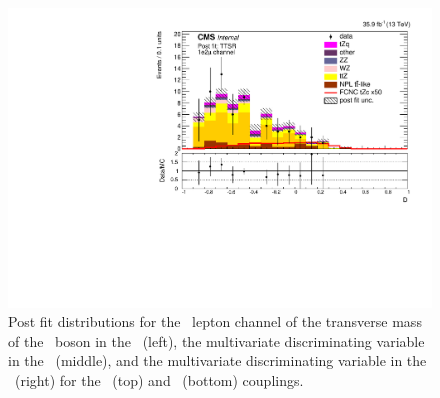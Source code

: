 \begin{figure}[htbp]
	\includegraphics[width=0.49\linewidth]{6_Search/Figures/ZctFit/shapes_fit_s_LepChan_1e2mu_TTSR_error_trial.pdf}
	\caption{Post fit distributions for the \emumu\ lepton channel of the transverse mass of the \PW\ boson in the \WZCR\ (left), the multivariate discriminating variable in the \STSR\ (middle), and the multivariate discriminating variable in the \TTSR\ (right) for the \Zut\ (top) and \Zct\ (bottom) couplings. }
	\label{fig:shapesfit1e2mu}
\end{figure}

